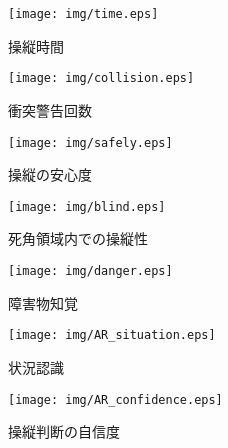 \documentclass
[a4paper,11pt]{jreport}
\begin{document}
\clearpage

\begin{figure}[bt]
	\begin{center}
    \texttt{[image: img/time.eps]}
    \caption{操縦時間}
    \label{tab:time}
    \end{center}
\end{figure}

\begin{figure}[bt]
	\begin{center}
    \texttt{[image: img/collision.eps]}
    \caption{衝突警告回数}
    \label{tab:collision}
    \end{center}
\end{figure}

\begin{figure}[bt]
	\begin{center}
    \texttt{[image: img/safely.eps]}
    \caption{操縦の安心度}
    \label{tab:safely}
    \end{center}
\end{figure}

\begin{figure}[bt]
	\begin{center}
    \texttt{[image: img/blind.eps]}
    \caption{死角領域内での操縦性}
    \label{tab:blind}
    \end{center}
\end{figure}

\begin{figure}[bt]
	\begin{center}
    \texttt{[image: img/danger.eps]}
    \caption{障害物知覚}
    \label{tab:danger}
    \end{center}
\end{figure}

\begin{figure}[bt]
	\begin{center}
    \texttt{[image: img/AR\_situation.eps]}
    \caption{状況認識}
    \label{tab:AR_situation}
    \end{center}
\end{figure}

\begin{figure}[bt]
	\begin{center}
    \texttt{[image: img/AR\_confidence.eps]}
    \caption{操縦判断の自信度}
    \label{tab:AR_confidence}
    \end{center}
\end{figure}
\end{document}

